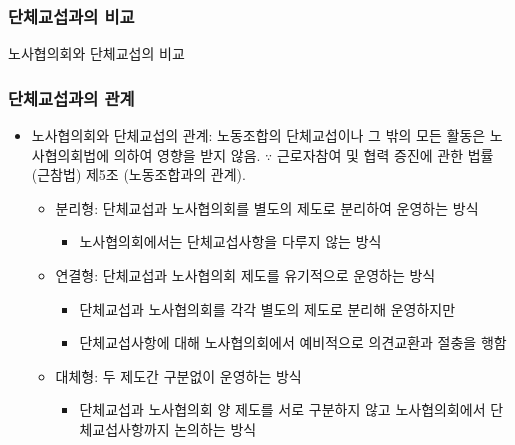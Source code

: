 \documentclass[aspectratio=169,xcolor=dvipsnames,handout]{beamer}
\begin{document}
\begin{frame}
    \frametitle{단체교섭과의 비교}
    \begin{table}
        \centering
        \resizebox{.8\textwidth}{!}{\relax
            
        }
        \caption{노사협의회와 단체교섭의 비교}
    \end{table}
\end{frame}

\begin{frame}
    \frametitle{단체교섭과의 관계}
    \begin{itemize}[<+->]
        \item 노사협의회와 단체교섭의 관계: 노동조합의 단체교섭이나 그 밖의 모든 활동은 노사협의회법에 의하여 영향을 받지 않음. $\because$ 근로자참여 및 협력 증진에 관한 법률 (근참법) 제5조 (노동조합과의 관계).
        \begin{itemize}
            \item 분리형: 단체교섭과 노사협의회를 별도의 제도로 분리하여 운영하는 방식
            \begin{itemize}
                \item 노사협의회에서는 단체교섭사항을 다루지 않는 방식
            \end{itemize}
            \item 연결형: 단체교섭과 노사협의회 제도를 유기적으로 운영하는 방식
            \begin{itemize}
                \item 단체교섭과 노사협의회를 각각 별도의 제도로 분리해 운영하지만
                \item 단체교섭사항에 대해 노사협의회에서 예비적으로 의견교환과 절충을 행함
            \end{itemize}
            \item 대체형: 두 제도간 구분없이 운영하는 방식
            \begin{itemize}
                \item 단체교섭과 노사협의회 양 제도를 서로 구분하지 않고 노사협의회에서 단체교섭사항까지 논의하는 방식
            \end{itemize}
        \end{itemize}
    \end{itemize}
\end{frame}
\end{document}

